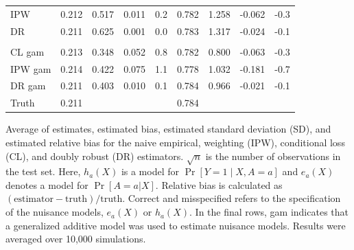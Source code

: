 \begin{table}[t]
\begin{threeparttable}
\begin{tabular}{lcccccccc}
    \hspace{1em}IPW & 0.212 & 0.517 & 0.011 & 0.2 & 0.782 & 1.258 & -0.062 & -0.3\\
    \hspace{1em}DR & 0.211 & 0.625 & 0.001 & 0.0 & 0.783 & 1.317 & -0.024 & -0.1\\
    \addlinespace[0.3em]
    \multicolumn{9}{l}{both misspecified}\\
    \hspace{1em}CL gam & 0.213 & 0.348 & 0.052 & 0.8 & 0.782 & 0.800 & -0.063 & -0.3\\
    \hspace{1em}IPW gam & 0.214 & 0.422 & 0.075 & 1.1 & 0.778 & 1.032 & -0.181 & -0.7\\
    \hspace{1em}DR gam & 0.211 & 0.403 & 0.010 & 0.1 & 0.784 & 0.966 & -0.021 & -0.1\\
    Truth & 0.211 & &  &  & 0.784 & &  & \\
    \bottomrule
    \end{tabular}
    \begin{tablenotes}
    \item Average of estimates, estimated bias, estimated standard deviation (SD), and estimated relative bias for the naive empirical, weighting (IPW), conditional loss (CL), and doubly robust (DR) estimators. $\sqrt{n}$ is the number of observations in the test set. Here, $h_a(X)$ is a model for $\operatorname{Pr}[Y=1 \mid X, A=a]$ and $e_a(X)$ denotes a model for $\Pr[A = a|X]$. Relative bias is calculated as $(\text{estimator} -\text{truth})/\text{truth}$. Correct and misspecified refers to the specification of the
    nuisance models, $e_a(X)$ or $h_a(X)$. In the final rows, gam indicates that a generalized additive model was used to estimate nuisance models. Results were averaged over 10,000 simulations.
    \end{tablenotes}
    \end{threeparttable}

\end{table}
